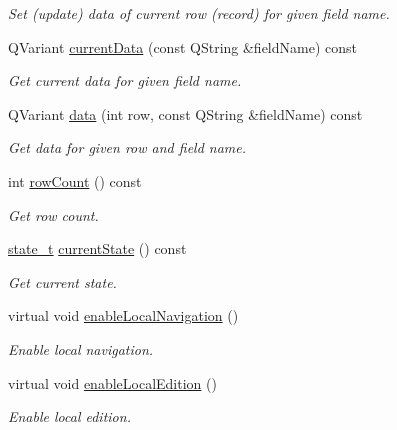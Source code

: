 \begin{DoxyCompactItemize}
\begin{DoxyCompactList}\small\item\em Set (update) data of current row (record) for given field name. \end{DoxyCompactList}\item 
Q\-Variant \hyperlink{classmdt_abstract_sql_widget_a10a2d7fff69ec7043db0df05cbbaa63c}{current\-Data} (const Q\-String \&field\-Name) const 
\begin{DoxyCompactList}\small\item\em Get current data for given field name. \end{DoxyCompactList}\item 
Q\-Variant \hyperlink{classmdt_abstract_sql_widget_a3d362ebfc2d4f4b40b48ca08db287b3c}{data} (int row, const Q\-String \&field\-Name) const 
\begin{DoxyCompactList}\small\item\em Get data for given row and field name. \end{DoxyCompactList}\item 
int \hyperlink{classmdt_abstract_sql_widget_a5e25e4a2e0dc56c06c530c9b543366f2}{row\-Count} () const 
\begin{DoxyCompactList}\small\item\em Get row count. \end{DoxyCompactList}\item 
\hyperlink{classmdt_abstract_sql_widget_a54e6a7f2b41fb3edfa1e4ed62abf4072}{state\-\_\-t} \hyperlink{classmdt_abstract_sql_widget_a786eb7b7b111eef748002419984be7d9}{current\-State} () const 
\begin{DoxyCompactList}\small\item\em Get current state. \end{DoxyCompactList}\item 
virtual void \hyperlink{classmdt_abstract_sql_widget_a586e89097e9b4c27888695796ce945a0}{enable\-Local\-Navigation} ()
\begin{DoxyCompactList}\small\item\em Enable local navigation. \end{DoxyCompactList}\item 
virtual void \hyperlink{classmdt_abstract_sql_widget_a4ad94a530c77292d122d38eb041da6e9}{enable\-Local\-Edition} ()
\begin{DoxyCompactList}\small\item\em Enable local edition. \end{DoxyCompactList}\item 

\end{DoxyCompactItemize}
